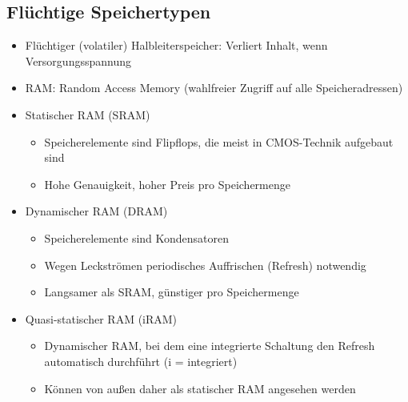 \documentclass{kit}
\begin{document}
  \subsection{Flüchtige Speichertypen}
    \begin{itemize}
      \item Flüchtiger (volatiler) Halbleiterspeicher: Verliert Inhalt, wenn Versorgungsspannung
      \item RAM: Random Access Memory (wahlfreier Zugriff auf alle Speicheradressen)
      \item Statischer RAM (SRAM)
        \begin{itemize}
          \item Speicherelemente sind Flipflops, die meist in CMOS-Technik aufgebaut sind
          \item Hohe Genauigkeit, hoher Preis pro Speichermenge
        \end{itemize}
      \item Dynamischer RAM (DRAM)
        \begin{itemize}
          \item Speicherelemente sind Kondensatoren
          \item Wegen Leckströmen periodisches Auffrischen (Refresh) notwendig
          \item Langsamer als SRAM, günstiger pro Speichermenge
        \end{itemize}
      \item Quasi-statischer RAM (iRAM)
        \begin{itemize}
          \item Dynamischer RAM, bei dem eine integrierte Schaltung den Refresh automatisch durchführt
            (i = integriert)
          \item Können von außen daher als statischer RAM angesehen werden
        \end{itemize}
    \end{itemize}
\end{document}
